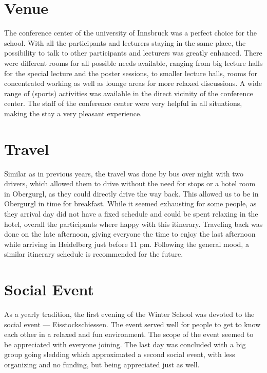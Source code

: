 \section*{Venue}
The conference center of the university of Innsbruck was a perfect choice for the school. With all the participants and lecturers staying in the same place, the possibility to talk to other participants and lecturers was greatly enhanced. There were different rooms for all possible needs available, ranging from big lecture halls for the special lecture and the poster sessions, to smaller lecture halls, rooms for concentrated working as well as lounge areas for more relaxed discussions. A wide range of (sports) activities was available in the direct vicinity of the conference center. The staff of the conference center were very helpful in all situations, making the stay a very pleasant experience.


\section*{Travel}
Similar as in previous years, the travel was done by bus over night with two drivers, which allowed them to drive without the need for stops or a hotel room in Obergurgl,
as they could directly drive the way back. This allowed us to be in Obergurgl in time for breakfast. While it seemed exhausting for some people, as they arrival day did not have a 
fixed schedule and could be spent relaxing in the hotel, overall the participants where happy with this itinerary.
Traveling back was done on the late afternoon, giving everyone the time to enjoy the last afternoon while arriving in Heidelberg just before 11 pm. Following the general mood, a similar itinerary schedule is recommended for the future.

\section*{Social Event}
As a yearly tradition, the first evening of the Winter School was
devoted to the social event — Eisstockschiessen. The event served well for people to get to know each other in a relaxed and fun environment. The scope of the event seemed to be appreciated with everyone joining.
The last day was concluded with a big group going sledding which approximated a second social event, 
with less organizing and no funding, but being appreciated just as well.



